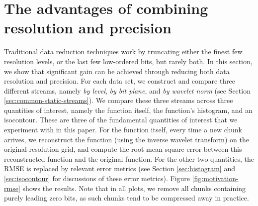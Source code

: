 \section{The advantages of combining resolution and precision}
\label{sec:motivation}

Traditional data reduction techniques work by truncating either the finest few resolution levels, or
the last few low-ordered bits, but rarely both. In this section, we show that significant gain can
be achieved through reducing both data resolution and precision. For each data set, we construct and
compare three different streams, namely \emph{by level}, \emph{by bit plane}, and \emph{by wavelet
norm} (see Section \ref{sec:common-static-streams}). We compare these three streams across three
quantities of interest, namely the function itself, the function's histogram, and an isocontour.
These are three of the fundamental quantities of interest that we experiment with in this paper. For
the function itself, every time a new chunk arrives, we reconstruct the function (using the inverse
wavelet transform) on the original-resolution grid, and compute the root-mean-square error between
this reconstructed function and the original function. For the other two quantities, the RMSE is
replaced by relevant error metrics (see Section \ref{sec:histogram} and \ref{sec:isocontour} for
discussions of these error metrics). Figure \ref{fig:motivation-rmse} shows the results. Note that
in all plots, we remove all chunks containing purely leading zero bits, as such chunks tend to be
compressed away in practice. 

